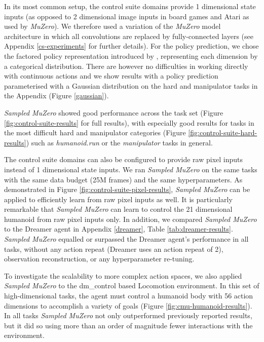 \documentclass{article}
\newcommand{\muzero}{\emph{MuZero}}
\newcommand{\smuzero}{\emph{Sampled MuZero}}
\begin{document}
In its most common setup, the control suite domains provide 1 dimensional state inputs (as opposed to 2 dimensional image inputs in board games and Atari as used by \muzero{}). We therefore used a variation of the \muzero{} model architecture in which all convolutions are replaced by fully-connected layers (see Appendix \ref{cs-experiments} for further details). For the policy prediction, we chose the factored policy representation introduced by \cite{tang2020discretizing}, representing each dimension by a categorical distribution. There are however no difficulties in working directly with continuous actions and we show results with a policy prediction parameterised with a Gaussian distribution on the hard and manipulator tasks in the Appendix (Figure \ref{gaussian}).

\smuzero{} showed good performance across the task set (Figure \ref{fig:control-suite-results} for full results), with especially good results for tasks in the most difficult hard and manipulator categories (Figure \ref{fig:control-suite-hard-results}) such as \emph{humanoid.run} or the \emph{manipulator} tasks in general.

The control suite domains can also be configured to provide raw pixel inputs instead of 1 dimensional state inputs. We ran \smuzero{} on the same tasks with the same data budget (25M frames) and the same hyperparameters. As demonstrated in Figure \ref{fig:control-suite-pixel-results}, \smuzero{} can be applied to efficiently learn from raw pixel inputs as well. It is particularly remarkable that \smuzero{} can learn to control the 21 dimensional humanoid from raw pixel inputs only. In addition, we compared \smuzero{} to the Dreamer agent \cite{hafner2019dream} in Appendix \ref{dreamer}, Table \ref{tab:dreamer-results}. \smuzero{} equalled or surpassed the Dreamer agent's performance in all tasks, without any action repeat (Dreamer uses an action repeat of 2), observation reconstruction, or any hyperparameter re-tuning.

To investigate the scalability to more complex action spaces, we also applied \smuzero{} to the dm\_control \cite{tassa2020dm_control} based Locomotion environment. In this set of high-dimensional tasks, the agent must control a humanoid body with 56 action dimensions to accomplish a variety of goals (Figure \ref{fig:cmu-humanoid-results}). In all tasks \smuzero{} not only outperformed previously reported results, but it did so using more than an order of magnitude fewer interactions with the environment.
\end{document}
